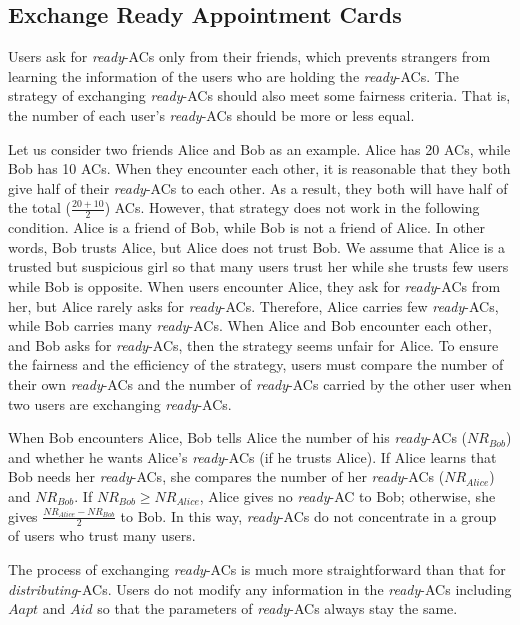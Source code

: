 \subsection{Exchange Ready Appointment Cards}

\noindent Users ask for \textit{ready}-ACs only from their friends, which prevents strangers from learning the information of the users who are holding the \textit{ready}-ACs. The strategy of exchanging \textit{ready}-ACs should also meet some fairness criteria. That is, the number of each user's \textit{ready}-ACs should be more or less equal. 

Let us consider two friends Alice and Bob as an example. Alice has 20 ACs, while Bob has 10 ACs. When they encounter each other, it is reasonable that they both give half of their \textit{ready}-ACs to each other. As a result, they both will have half of the total ($\frac{20+10}{2}$) ACs. However, that strategy does not work in the following condition. Alice is a friend of Bob, while Bob is not a friend of Alice. In other words, Bob trusts Alice, but Alice does not trust Bob. We assume that Alice is a trusted but suspicious girl so that many users trust her while she trusts few users while Bob is opposite. When users encounter Alice, they ask for \textit{ready}-ACs from her, but Alice rarely asks for \textit{ready}-ACs. Therefore, Alice carries few \textit{ready}-ACs, while Bob carries many \textit{ready}-ACs. When Alice and Bob encounter each other, and Bob asks for \textit{ready}-ACs, then the strategy seems unfair for Alice. To ensure the fairness and the efficiency of the strategy, users must compare the number of their own \textit{ready}-ACs and the number of \textit{ready}-ACs carried by the other user when two users are exchanging \textit{ready}-ACs.

When Bob encounters Alice, Bob tells Alice the number of his \textit{ready}-ACs (${NR}_{Bob}$) and whether he wants Alice's \textit{ready}-ACs (if he trusts Alice). If Alice learns that Bob needs her \textit{ready}-ACs, she compares the number of her \textit{ready}-ACs (${NR}_{Alice}$) and ${NR}_{Bob}$. If ${NR}_{Bob}\ge {NR}_{Alice}$, Alice gives no \textit{ready}-AC to Bob; otherwise, she gives $\frac{{NR}_{Alice}-{NR}_{Bob}}{2}$ to Bob. In this way, \textit{ready}-ACs do not concentrate in a group of users who trust many users. 

The process of exchanging \textit{ready}-ACs is much more straightforward than that for \textit{distributing}-ACs. Users do not modify any information in the \textit{ready}-ACs including $Aapt$ and $Aid$ so that the parameters of \textit{ready}-ACs always stay the same.

